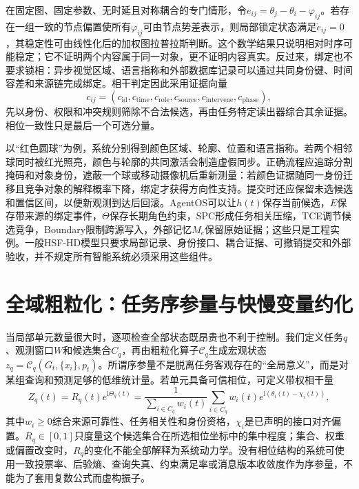 在固定图、固定参数、无时延且对称耦合的专门情形，令$e_{ij}=\theta_j-\theta_i-\varphi_{ij}$。若存在一组一致的节点偏置使所有$\varphi_{ij}$可由节点势差表示，则局部锁定状态满足$\dot e_{ij}=0$，其稳定性可由线性化后的加权图拉普拉斯判断。这个数学结果只说明相对时序可能稳定；它不证明两个内容属于同一对象，更不证明内容真实。反过来，绑定也不要求锁相：异步视觉区域、语言指称和外部数据库记录可以通过共同身份键、时间容差和来源链完成绑定。相干判定因此采用证据向量
\begin{equation}
c_{ij}=(c_{\mathrm{id}},c_{\mathrm{time}},c_{\mathrm{role}},c_{\mathrm{source}},c_{\mathrm{intervene}},c_{\mathrm{phase}}),
\end{equation}
先以身份、权限和冲突规则筛除不合法候选，再由任务特定读出器综合其余证据。相位一致性只是最后一个可选分量。

以“红色圆球”为例，系统分别得到颜色区域、轮廓、位置和语言指称。若两个相邻球同时被红光照亮，颜色与轮廓的共同激活会制造虚假同步。正确流程应追踪分割掩码和对象身份，遮蔽一个球或移动摄像机后重新测量：若颜色证据随同一身份迁移且竞争对象的解释概率下降，绑定才获得方向性支持。提交时还应保留未选候选和置信区间，以便新观测到达后回滚。AgentOS可以让$h(t)$保存当前候选，$E$保存带来源的绑定事件，$\Theta$保存长期角色约束，SPC形成任务相关压缩，TCE调节候选竞争，Boundary限制跨源写入，外部记忆$M_e$保留原始证据；这些只是工程实例。一般HSF-HD模型只要求局部记录、身份接口、耦合证据、可撤销提交和外部验收，并不规定所有智能系统必须采用这些组件。

\section{全域粗粒化：任务序参量与快慢变量约化}
\label{sec:global_dynamics_order_parameter}

当局部单元数量很大时，逐项检查全部状态既昂贵也不利于控制。我们定义任务$q$、观测窗口$W$和候选集合$C_q$，再由粗粒化算子$\mathcal C_q$生成宏观状态$z_q=\mathcal C_q(G_t,\{x_i\},p_t)$。所谓序参量不是脱离任务客观存在的“全局意义”，而是对某组查询和预测足够的低维统计量。若单元具备可信相位，可定义带权相干量
\begin{equation}
Z_q(t)=R_q(t)e^{\mathrm i\Theta_q(t)}=
\frac{1}{\sum_{i\in C_q}w_i(t)}\sum_{i\in C_q}w_i(t)e^{\mathrm i(\theta_i(t)-\chi_i(t))},
\label{eq:task_order_parameter}
\end{equation}
其中$w_i\geq0$综合来源可靠性、任务相关性和身份资格，$\chi_i$是已声明的接口对齐偏置。$R_q\in[0,1]$只度量这个候选集合在所选相位坐标中的集中程度；集合、权重或偏置改变时，$R_q$的变化不能全部解释为系统动力学。没有相位结构的系统可使用一致投票率、后验熵、查询失真、约束满足率或消息版本收敛度作为序参量，不能为了套用复数公式而虚构振子。

